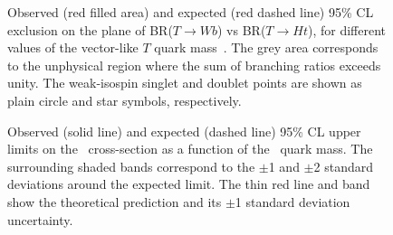 \begin{figure}[h!tb]\begin{center}
	\caption{Observed (red filled area) and expected (red dashed line) 95\% CL exclusion on the plane of BR($T\to Wb$) vs BR($T\to Ht$), 
for different values of the vector-like $T$ quark mass~\cite{ATLAS:2012qe}.  The
grey area corresponds to the unphysical region where the sum of branching ratios exceeds unity. 
The weak-isospin singlet and doublet points are shown as plain circle and star symbols, respectively.\label{fig:7tevwbwb}}
\end{center}\end{figure}
\begin{figure}[h!tb]\begin{center}
	\caption{Observed (solid line) and expected (dashed line) 95\% CL upper limits on the \TTbar\ 
        cross-section as a function of the \T\ quark mass. The surrounding shaded bands correspond 
        to the $\pm$1 and $\pm$2 standard deviations around the expected limit. 
        The thin red line and band show the theoretical prediction and its $\pm$1 standard deviation uncertainty. \label{fig:7tevCL}}
\end{center}\end{figure}
